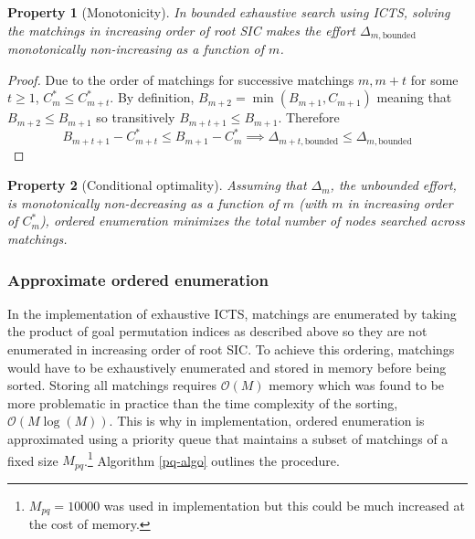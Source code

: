 \documentclass[english]{article}
\newtheorem{property}{Property}
\begin{document}
	\begin{property}[Monotonicity]
		\label{monotonicity}
		In bounded exhaustive search using ICTS, solving the matchings in increasing order of root SIC makes the effort $\Delta_{m,\text{bounded}}$ monotonically non-increasing as a function of $m$.
	\end{property}
	\begin{proof}
		Due to the order of matchings for successive matchings $m,m+t$ for some $t\geq 1$, $C^*_{m} \leq C^*_{m+t}$. By definition, $B_{m+2} = \min(B_{m+1},C_{m+1})$ meaning that $B_{m+2} \leq B_{m + 1}$ so transitively $B_{m+t+1} \leq B_{m+1}$. Therefore
		\[B_{m+t+1} - C^*_{m+t}\leq B_{m+1} - C^*_m\implies \Delta_{m+t,\text{bounded}} \leq \Delta_{m,\text{bounded}}\]
	\end{proof}
	\begin{property}[Conditional optimality]
		\label{cond-monoton-optim}
		Assuming that $\Delta_m$, the unbounded effort, is monotonically non-decreasing as a function of $m$ (with $m$ in increasing order of $C^*_m$), ordered enumeration minimizes the total number of nodes searched across matchings.
	\end{property}
	\subsubsection{Approximate ordered enumeration}
	In the implementation of exhaustive ICTS, matchings are enumerated by taking the product of goal permutation indices as described above so they are not enumerated in increasing order of root SIC. To achieve this ordering, matchings would have to be exhaustively enumerated and stored in memory before being sorted. Storing all matchings requires $\mathcal{O}(M)$ memory which was found to be more problematic in practice than the time complexity of the sorting, $\mathcal{O}(M\log(M))$. This is why in implementation, ordered enumeration is approximated using a priority queue that maintains a subset of matchings of a fixed size $M_{pq}$.\footnote{$M_{pq} = 10000$ was used in implementation but this could be much increased at the cost of memory.} Algorithm \ref{pq-algo} outlines the procedure.
	
	
	
\end{document}

